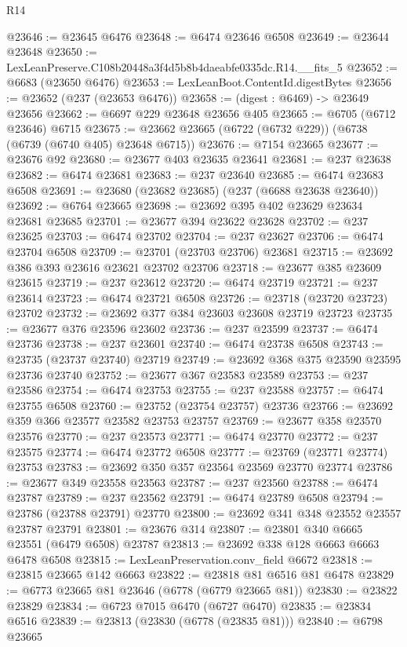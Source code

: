 \begin{lexlean}{R14}
\begin{coremodule}
@23646 := @23645 @6476
@23648 := @6474 @23646 @6508
@23649 := @23644 @23648
@23650 := LexLeanPreserve.C108b20448a3f4d5b8b4daeabfe0335dc.R14.__fits_5
@23652 := @6683 (@23650 @6476)
@23653 := LexLeanBoot.ContentId.digestBytes
@23656 := @23652 (@237 (@23653 @6476))
@23658 := (digest : @6469) -> @23649 @23656
@23662 := @6697 @229 @23648 @23656 @405
@23665 := @6705 (@6712 @23646) @6715
@23675 := @23662 @23665 (@6722 (@6732 @229)) (@6738 (@6739 (@6740 @405) @23648 @6715))
@23676 := @7154 @23665
@23677 := @23676 @92
@23680 := @23677 @403 @23635 @23641
@23681 := @237 @23638
@23682 := @6474 @23681
@23683 := @237 @23640
@23685 := @6474 @23683 @6508
@23691 := @23680 (@23682 @23685) (@237 (@6688 @23638 @23640))
@23692 := @6764 @23665
@23698 := @23692 @395 @402 @23629 @23634 @23681 @23685
@23701 := @23677 @394 @23622 @23628
@23702 := @237 @23625
@23703 := @6474 @23702
@23704 := @237 @23627
@23706 := @6474 @23704 @6508
@23709 := @23701 (@23703 @23706) @23681
@23715 := @23692 @386 @393 @23616 @23621 @23702 @23706
@23718 := @23677 @385 @23609 @23615
@23719 := @237 @23612
@23720 := @6474 @23719
@23721 := @237 @23614
@23723 := @6474 @23721 @6508
@23726 := @23718 (@23720 @23723) @23702
@23732 := @23692 @377 @384 @23603 @23608 @23719 @23723
@23735 := @23677 @376 @23596 @23602
@23736 := @237 @23599
@23737 := @6474 @23736
@23738 := @237 @23601
@23740 := @6474 @23738 @6508
@23743 := @23735 (@23737 @23740) @23719
@23749 := @23692 @368 @375 @23590 @23595 @23736 @23740
@23752 := @23677 @367 @23583 @23589
@23753 := @237 @23586
@23754 := @6474 @23753
@23755 := @237 @23588
@23757 := @6474 @23755 @6508
@23760 := @23752 (@23754 @23757) @23736
@23766 := @23692 @359 @366 @23577 @23582 @23753 @23757
@23769 := @23677 @358 @23570 @23576
@23770 := @237 @23573
@23771 := @6474 @23770
@23772 := @237 @23575
@23774 := @6474 @23772 @6508
@23777 := @23769 (@23771 @23774) @23753
@23783 := @23692 @350 @357 @23564 @23569 @23770 @23774
@23786 := @23677 @349 @23558 @23563
@23787 := @237 @23560
@23788 := @6474 @23787
@23789 := @237 @23562
@23791 := @6474 @23789 @6508
@23794 := @23786 (@23788 @23791) @23770
@23800 := @23692 @341 @348 @23552 @23557 @23787 @23791
@23801 := @23676 @314
@23807 := @23801 @340 @6665 @23551 (@6479 @6508) @23787
@23813 := @23692 @338 @128 @6663 @6663 @6478 @6508
@23815 := LexLeanPreservation.conv_field @6672
@23818 := @23815 @23665 @142 @6663
@23822 := @23818 @81 @6516 @81 @6478
@23829 := @6773 @23665 @81 @23646 (@6778 (@6779 @23665 @81))
@23830 := @23822 @23829
@23834 := @6723 @7015 @6470 (@6727 @6470)
@23835 := @23834 @6516
@23839 := @23813 (@23830 (@6778 (@23835 @81)))
@23840 := @6798 @23665

\end{coremodule}
\end{lexlean}
